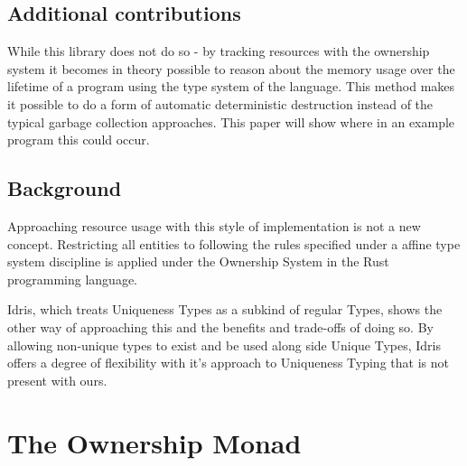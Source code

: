 \documentclass[onehalf,11pt]{beavtex}
\begin{document}
\section{Additional contributions}

While this library does not do so - by tracking resources with the ownership
system it becomes in theory possible to reason about the memory usage over the
lifetime of a program using the type system of the language. 
This method makes it possible to do a form of automatic deterministic destruction
instead of the typical garbage collection approaches.  This paper will show
where in an example program this could occur.


\section{Background}

Approaching resource usage with this style of implementation is not a new
concept.
Restricting all entities to following the rules specified under a affine type
system discipline is applied under the Ownership System in the Rust
programming language. 

Idris, which treats Uniqueness Types as a subkind of regular Types, shows
the other way of approaching this and the benefits and trade-offs of doing so.
By allowing non-unique types to exist and be used along side Unique Types,
Idris offers a degree of flexibility with it's approach to Uniqueness
Typing that is not present with ours. %



\chapter{The Ownership Monad}
\end{document}
